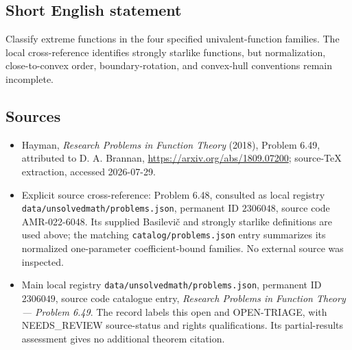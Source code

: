 \documentclass[11pt]{article}
\begin{document}
\subsection{Short English statement}
Classify extreme functions in the four specified univalent-function families. The local cross-reference identifies strongly starlike functions, but normalization, close-to-convex order, boundary-rotation, and convex-hull conventions remain incomplete.
\subsection{Sources}
\begin{itemize}
\item Hayman, \emph{Research Problems in Function Theory} (2018), Problem 6.49, attributed to D. A. Brannan, \url{https://arxiv.org/abs/1809.07200}; source-TeX extraction, accessed 2026-07-29.
\item Explicit source cross-reference: Problem 6.48, consulted as local registry \texttt{data/unsolvedmath/problems.json}, permanent ID $2306048$, source code AMR-022-6048. Its supplied Basilevi\v{c} and strongly starlike definitions are used above; the matching \texttt{catalog/problems.json} entry summarizes its normalized one-parameter coefficient-bound families. No external source was inspected.
\item Main local registry \texttt{data/unsolvedmath/problems.json}, permanent ID $2306049$, source code catalogue entry, \emph{Research Problems in Function Theory --- Problem 6.49}. The record labels this open and OPEN-TRIAGE, with NEEDS\_REVIEW source-status and rights qualifications. Its partial-results assessment gives no additional theorem citation.
\end{itemize}
\end{document}
